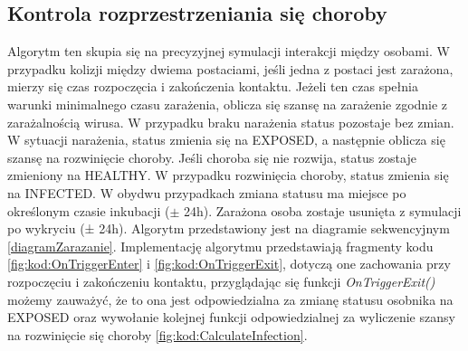 \subsection{Kontrola rozprzestrzeniania się choroby}
Algorytm ten skupia się na precyzyjnej symulacji interakcji między osobami. W przypadku kolizji między dwiema postaciami, jeśli jedna z postaci jest zarażona, mierzy się czas rozpoczęcia i zakończenia kontaktu. Jeżeli ten czas spełnia warunki minimalnego czasu zarażenia, oblicza się szansę na zarażenie zgodnie z zarażalnością wirusa. W przypadku braku narażenia status pozostaje bez zmian. W sytuacji narażenia, status zmienia się na EXPOSED, a następnie oblicza się szansę na rozwinięcie choroby. Jeśli choroba się nie rozwija, status zostaje zmieniony na HEALTHY. W przypadku rozwinięcia choroby, status zmienia się na INFECTED. W obydwu przypadkach zmiana statusu ma miejsce po określonym czasie inkubacji ($\pm$ 24h). Zarażona osoba zostaje usunięta z symulacji po wykryciu (± 24h). Algorytm przedstawiony jest na diagramie sekwencyjnym \ref{diagramZarazanie}. Implementację algorytmu przedstawiają fragmenty kodu \ref{fig:kod:OnTriggerEnter} i \ref{fig:kod:OnTriggerExit}, dotyczą one zachowania przy rozpoczęciu i zakończeniu kontaktu, przyglądając się funkcji \textit{OnTriggerExit()} możemy zauważyć, że to ona jest odpowiedzialna za zmianę statusu osobnika na EXPOSED oraz wywołanie kolejnej funkcji odpowiedzialnej za wyliczenie szansy na rozwinięcie się choroby \ref{fig:kod:CalculateInfection}.

